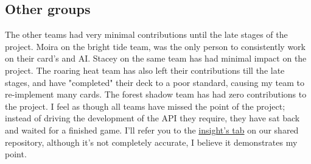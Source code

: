 \documentclass[a4paper]{article}
\begin{document}
\subsection{Other groups}
The other teams had very minimal contributions until the late stages of the project. Moira on the bright tide team, was the only person to consistently work on their card's and AI. Stacey on the same team has had minimal impact on the project. The roaring heat team has also left their contributions till the late stages, and have "completed" their deck to a poor standard, causing my team to re-implement many cards. The forest shadow team has had zero contributions to the project. I feel as though all teams have missed the point of the project; instead of driving the development of the API they require, they have sat back and waited for a finished game. I'll refer you to the \href{https://github.com/nitronoid/PokemonTCG/graphs/contributors}{insight's tab} on our shared repository, although it's not completely accurate, I believe it demonstrates my point.
\end{document}
